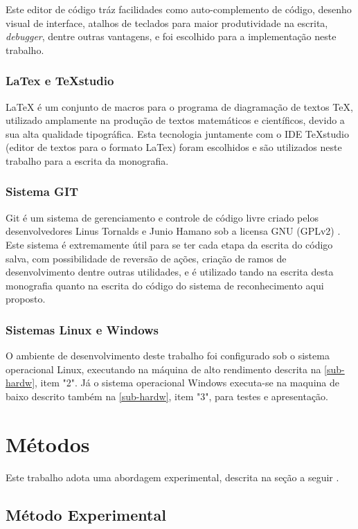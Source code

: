Este editor de código tráz facilidades como auto-complemento de código, desenho visual de interface, atalhos de teclados para maior produtividade na escrita, \textit{debugger}, dentre outras vantagens, e foi escolhido para a implementação neste trabalho.

\subsubsection{LaTex e TeXstudio}\label{subsec:latex}
LaTeX é um conjunto de macros para o programa de diagramação de textos TeX, utilizado amplamente na produção de textos matemáticos e científicos, devido a sua alta qualidade tipográfica. Esta tecnologia juntamente com o IDE TeXstudio (editor de textos para o formato LaTex) foram escolhidos e são utilizados neste trabalho para a escrita da monografia.

\subsubsection{Sistema GIT}\label{subsec:git}
Git é um sistema de gerenciamento e controle de código livre criado pelos desenvolvedores Linus Tornalds e Junio Hamano sob a licensa GNU (GPLv2) \cite{git}. Este sistema é extremamente útil para se ter cada etapa da escrita do código salva, com possibilidade de reversão de ações, criação de ramos de desenvolvimento dentre outras utilidades, e é utilizado tando na escrita desta monografia quanto na escrita do código do sistema de reconhecimento aqui proposto.

\subsubsection{Sistemas Linux e Windows}\label{subsec:linux}
O ambiente de desenvolvimento deste trabalho foi configurado sob o sistema operacional Linux, executando na máquina de alto rendimento descrita na \autoref{sub-hardw}, item "2". Já o sistema operacional Windows executa-se na maquina de baixo descrito também na \autoref{sub-hardw}, item "3", para testes e apresentação.


\section{Métodos}\label{sec:metodos}
Este trabalho adota uma abordagem experimental, descrita na seção a seguir \cite{fachin-metodos}.


\subsection{Método Experimental}\label{metex}

